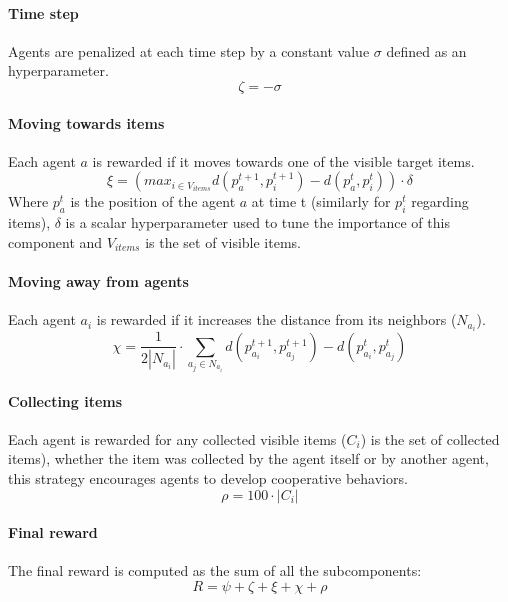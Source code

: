 \documentclass[sigconf]{acmart}
\begin{document}
\paragraph{Time step} Agents are penalized at each time step by a constant value $\sigma$ defined as
    an hyperparameter.
    \[ \zeta = - \sigma \]
 
\paragraph{Moving towards items} Each agent $a$ is rewarded if it moves towards one of the visible target items.
    \[ \xi = (max_{i \in V_{items}} d(p_a^{t+1}, p_i^{t+1}) - d(p_a^{t}, p_i^{t})) \cdot \delta\]
    Where $p_a^t$ is the position of the agent $a$ at time t (similarly for $p_i^{t}$ regarding items),
    $\delta$ is a scalar hyperparameter used to tune the importance of this component and
    $V_{items}$ is the set of visible items.
\paragraph{Moving away from agents} Each agent $a_i$ is rewarded if it increases the distance from its neighbors ($N_{a_i}$).
    \[ \chi = \frac{1}{2|N_{a_i}|} \cdot \sum_{a_j \in N_{a_i}} d(p_{a_i}^{t+1}, p_{a_j}^{t+1}) - d(p_{a_i}^{t}, p_{a_j}^{t}) \]

\paragraph{Collecting items} Each agent is rewarded for any collected visible items ($C_i$) is the set of collected items), 
    whether the item was collected by  the agent itself or by another agent, this strategy encourages agents 
    to develop cooperative behaviors.
    \[ \rho = 100 \cdot |C_i| \]

\paragraph{Final reward} The final reward is computed as the sum of all the subcomponents: 
  \[ R = \psi + \zeta + \xi + \chi + \rho \]
  
\end{document}
